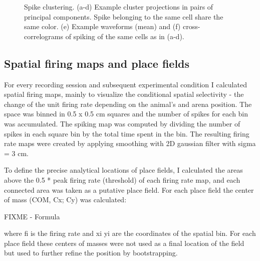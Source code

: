 \begin{figure}
\captionsetup{format=plain}
\caption[spikesorting]{
Spike clustering. (a-d) Example cluster projections in pairs of principal components. Spike belonging to the same cell share the same color. (e) Example waveforms (mean) and (f) cross-correlograms of spiking of the same cells as in (a-d).
}
\label{fig:F34_spikesorting}
\end{figure}


\subsection{Spatial firing maps and place fields}

For every recording session and subsequent experimental condition I calculated spatial firing maps, mainly to visualize the conditional spatial selectivity - the change of the unit firing rate depending on the animal’s and arena position. The space was binned in 0.5 x 0.5 cm squares and the number of spikes for each bin was accumulated. The spiking map was computed by dividing the number of spikes in each square bin by the total time spent in the bin. The resulting firing rate maps were created by applying smoothing with 2D gaussian filter with sigma = 3 cm.

To define the precise analytical locations of place fields, I calculated the areas above the 0.5 * peak firing rate (threshold) of each firing rate map, and each connected area was taken as a putative place field. For each place field the center of mass (COM, Cx; Cy) was calculated:

FIXME - Formula

where fi  is the firing rate and xi  yi  are the coordinates of the spatial bin. For each place field these centers of masses were not used as a final location of the field but used to further refine the position by bootstrapping.

